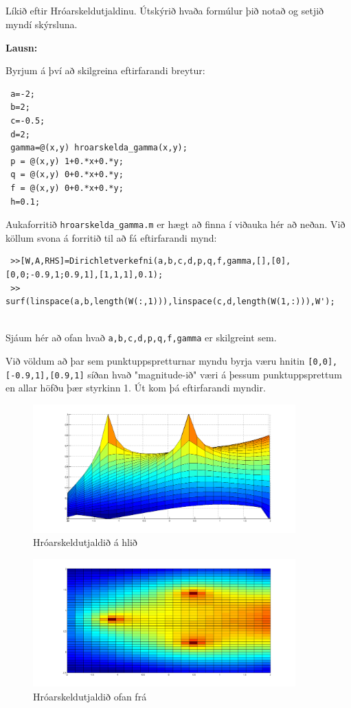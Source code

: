 \documentclass[11pt,a4paper,titlepage]{article}
\begin{document}
\newpage
 
 \subsection{}
 Líkið eftir Hróarskeldutjaldinu. Útskýrið hvaða formúlur þið notað og setjið myndí skýrsluna. 
 
 \textbf{Lausn:}
 
 Byrjum á því að skilgreina eftirfarandi breytur:
 \begin{verbatim}
 a=-2;
 b=2;
 c=-0.5;
 d=2;
 gamma=@(x,y) hroarskelda_gamma(x,y);
 p = @(x,y) 1+0.*x+0.*y;
 q = @(x,y) 0+0.*x+0.*y;
 f = @(x,y) 0+0.*x+0.*y;
 h=0.1;
 \end{verbatim}
 Aukaforritið   \verb|hroarskelda_gamma.m| er hægt að finna í viðauka hér að neðan.  Við köllum svona á forritið til að fá eftirfarandi mynd:
 \begin{verbatim}
 >>[W,A,RHS]=Dirichletverkefni(a,b,c,d,p,q,f,gamma,[],[0],[0,0;-0.9,1;0.9,1],[1,1,1],0.1);
 >> surf(linspace(a,b,length(W(:,1))),linspace(c,d,length(W(1,:))),W');
 
 \end{verbatim}
 Sjáum hér að ofan hvað  \verb|a,b,c,d,p,q,f,gamma| er skilgreint sem. 
 
 Við völdum að þar sem punktuppspretturnar myndu byrja væru hnitin  \verb|[0,0],[-0.9,1],[0.9,1]|  síðan hvað "magnitude-ið" væri á þessum punktuppsprettum en allar höfðu þær styrkinn 1. Út kom þá eftirfarandi myndir. 
 
 \begin{figure}[h!]
     \centering
     \includegraphics[width=0.9\textwidth]{hroarskelda_hlid.png}
     \caption{Hróarskeldutjaldið á hlið}
     \label{fig:awesome_image9}
 \end{figure}
 
 \begin{figure}[h!]
     \centering
     \includegraphics[width=0.9\textwidth]{hroarskelda_top.png}
     \caption{Hróarskeldutjaldið ofan frá }
     \label{fig:awesome_image10}
 \end{figure}
 
\end{document}
